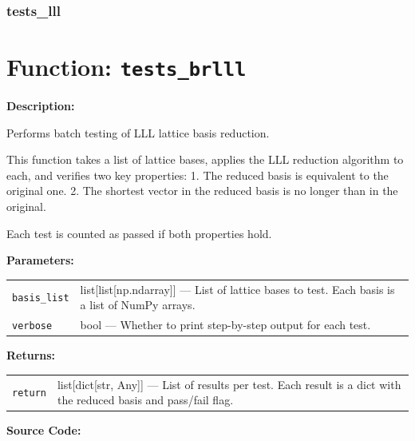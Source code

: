 \documentclass[a4paper,12pt]{article}
\begin{document}


\subsubsection{tests\_lll}

\section*{Function: \texttt{tests\_brlll}}

\textbf{Description:}

Performs batch testing of LLL lattice basis reduction.

This function takes a list of lattice bases, applies the LLL reduction
algorithm to each, and verifies two key properties:
  1. The reduced basis is equivalent to the original one.
  2. The shortest vector in the reduced basis is no longer than in the original.

Each test is counted as passed if both properties hold.

\vspace{1em}
\newpage
\textbf{Parameters:}

\vspace{1em}
\noindent
\begin{tabular}{p{3cm} p{11cm}}
\texttt{basis\_list} & list[list[np.ndarray]] — List of lattice bases to test. Each basis is a list of NumPy arrays. \\
\texttt{verbose} & bool — Whether to print step-by-step output for each test. \\
\end{tabular}

\vspace{1em}
\noindent
\textbf{Returns:}

\begin{tabular}{p{3cm} p{11cm}}
\texttt{return} & list[dict[str, Any]] — List of results per test. Each result is a dict with the reduced basis and pass/fail flag. \\
\end{tabular}

\textbf{Source Code:}
\end{document}
